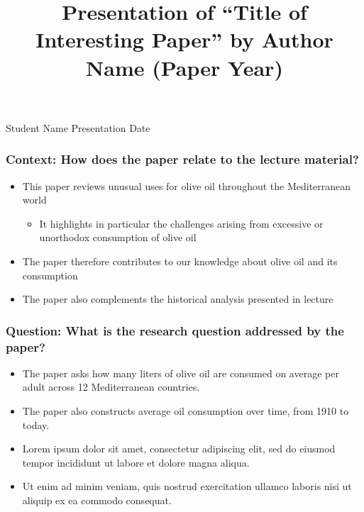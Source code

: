 \documentclass[11pt,xcolor={dvipsnames},hyperref={pdftex,pdfpagemode=UseNone,hidelinks,pdfdisplaydoctitle=true},usepdftitle=false]{beamer}
\begin{document}
\title{Presentation of ``Title of Interesting Paper'' by Author Name (Paper Year)}
\information%
{Student Name}%
{Presentation Date}
\frame{\titlepage}

\begin{frame}
\frametitle{Context: How does the paper relate to the lecture material?}
\begin{itemize}
\item This paper reviews unusual uses for olive oil throughout the Mediterranean world 
\begin{itemize}
\item It highlights in particular the challenges arising from excessive or unorthodox consumption of olive oil
\end{itemize}
\item The paper therefore contributes to our knowledge about olive oil and its consumption
\item The paper also complements the historical analysis presented in lecture
\end{itemize}	
\end{frame}

\begin{frame}
\frametitle{Question: What is the research question addressed by the paper?}
\begin{itemize}
\item The paper asks how many liters of olive oil are consumed on average per adult across 12 Mediterranean countries.
\item The paper also constructs average oil consumption over time, from 1910 to today.
\item Lorem ipsum dolor sit amet, consectetur adipiscing elit, sed do eiusmod tempor incididunt ut labore et dolore magna aliqua.
\item Ut enim ad minim veniam, quis nostrud exercitation ullamco laboris nisi ut aliquip ex ea commodo consequat.
\end{itemize}	
\end{frame}
\end{document}

